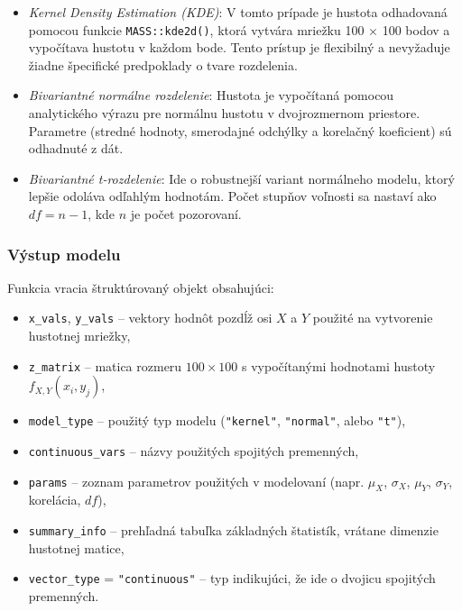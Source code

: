 \begin{itemize}
  \item \textit{Kernel Density Estimation (KDE)}:  
  V tomto prípade je hustota odhadovaná pomocou funkcie \texttt{MASS::kde2d()}, ktorá vytvára mriežku 100 × 100 bodov a vypočítava hustotu v každom bode. Tento prístup je flexibilný a nevyžaduje žiadne špecifické predpoklady o tvare rozdelenia.

  \item \textit{Bivariantné normálne rozdelenie}:  
  Hustota je vypočítaná pomocou analytického výrazu pre normálnu hustotu v dvojrozmernom priestore. Parametre (stredné hodnoty, smerodajné odchýlky a korelačný koeficient) sú odhadnuté z dát.

  \item \textit{Bivariantné t-rozdelenie}:  
  Ide o robustnejší variant normálneho modelu, ktorý lepšie odoláva odľahlým hodnotám. Počet stupňov voľnosti sa nastaví ako $df = n - 1$, kde $n$ je počet pozorovaní.
\end{itemize}

\subsubsection{Výstup modelu}

Funkcia vracia štruktúrovaný objekt obsahujúci:

\begin{itemize}
  \item \texttt{x\_vals}, \texttt{y\_vals} – vektory hodnôt pozdĺž osi $X$ a $Y$ použité na vytvorenie hustotnej mriežky,
  \item \texttt{z\_matrix} – matica rozmeru $100 \times 100$ s vypočítanými hodnotami hustoty $f_{X,Y}(x_i, y_j)$,
  \item \texttt{model\_type} – použitý typ modelu (\texttt{"kernel"}, \texttt{"normal"}, alebo \texttt{"t"}),
  \item \texttt{continuous\_vars} – názvy použitých spojitých premenných,
  \item \texttt{params} – zoznam parametrov použitých v modelovaní (napr. $\mu_X$, $\sigma_X$, $\mu_Y$, $\sigma_Y$, korelácia, $df$),
  \item \texttt{summary\_info} – prehľadná tabuľka základných štatistík, vrátane dimenzie hustotnej matice,
  \item \texttt{vector\_type} = \texttt{"continuous"} – typ indikujúci, že ide o dvojicu spojitých premenných.
\end{itemize}

